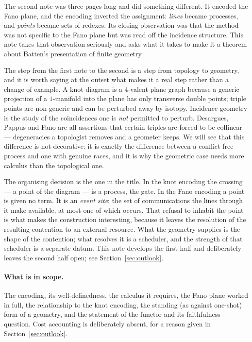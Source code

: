 \documentclass[11pt]{article}
\theoremstyle{plain}
\theoremstyle{definition}
\theoremstyle{remark}
\begin{document}
The second note \cite{Fano05} was three pages long and did something different. It encoded
the Fano plane, and the encoding inverted the assignment: \emph{lines} became processes,
and \emph{points} became sets of redexes. Its closing observation was that the method was
not specific to the Fano plane but was read off the incidence structure. This note takes
that observation seriously and asks what it takes to make it a theorem about Batten's
presentation of finite geometry \cite{Batten}.

The step from the first note to the second is a step from topology to geometry, and it is
worth saying at the outset what makes it a real step rather than a change of example. A
knot diagram is a $4$-valent plane graph because a generic projection of a $1$-manifold
into the plane has only transverse double points; triple points are non-generic and can be
perturbed away by isotopy. Incidence geometry is the study of the coincidences one is
\emph{not} permitted to perturb. Desargues, Pappus and Fano are all assertions that
certain triples are forced to be collinear --- degeneracies a topologist removes and a
geometer keeps. We will see that this difference is not decorative: it is exactly the
difference between a conflict-free process and one with genuine races, and it is why the
geometric case needs more calculus than the topological one.

The organising decision is the one in the title. In the knot encoding the crossing --- a
point of the diagram --- is a process, the gate. In the Fano encoding a point is given no
term. It is an \emph{event site}: the set of communications the lines through it make
available, at most one of which occurs. That refusal to inhabit the point is what makes
the construction interesting, because it leaves the resolution of the resulting contention
to an external resource. What the geometry supplies is the shape of the contention; what
resolves it is a scheduler, and the strength of that scheduler is a separate datum. This
note develops the first half and deliberately leaves the second half open; see
Section~\ref{sec:outlook}.

\paragraph{What is in scope.} The encoding, its well-definedness, the calculus it requires,
the Fano plane worked in full, the relationship to the knot encoding, the standing (as
against one-shot) form of a geometry, and the statement of the functor and its
faithfulness question. Cost accounting is deliberately absent, for a reason given in
Section~\ref{sec:outlook}.
\end{document}
